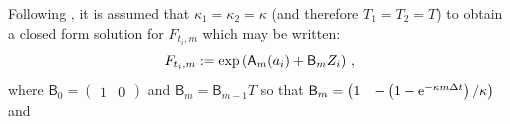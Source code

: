 \medskip
 
Following \cite{almansour:2016}, it is assumed that $\kappa_1 = \kappa_2 = \kappa$ (and therefore $T_1=T_2=T$) to obtain a closed form solution for $F_{t_i,m}$ which may be written: 
\[
F_{t_i,m} := \exp\left( \mathsf{A}_{m}(a_{i}) + \mathsf{B}_{m} Z_{i}\right)\,,
\]
where $\mathsf{B}_0	= \begin{pmatrix}1 & 0 \end{pmatrix}$ and  $\mathsf{B}_m    = \mathsf{B}_{m-1} T$ so that  $ \mathsf{B}_m= \begin{pmatrix} 1 & -\left(1-\mathrm{e}^{-\kappa m \Delta t}\right)/\kappa \end{pmatrix}$ and
